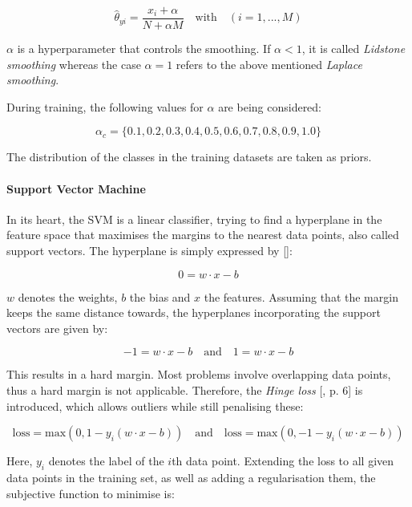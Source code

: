 \documentclass[11pt]{scrartcl}
\begin{document}
\begin{equation}
	\hat{\theta}_{yi} = \frac{x_{i} + \alpha}{N + \alpha M} \quad\text{with}\quad (i = 1,...,M)
\end{equation}

$\alpha$ is a hyperparameter that controls the smoothing. If $\alpha < 1$, it is called \textit{Lidstone smoothing} whereas the case $\alpha = 1$ refers to the above mentioned \textit{Laplace smoothing}.

During training, the following values for $\alpha$ are being considered:

\begin{equation}
	\alpha_c = \{0.1, 0.2, 0.3, 0.4, 0.5, 0.6, 0.7, 0.8, 0.9, 1.0\}
\end{equation}

The distribution of the classes in the training datasets are taken as priors.

\paragraph{Support Vector Machine} In its heart, the SVM is a linear classifier, trying to find a hyperplane in the feature space that maximises the margins to the nearest data points, also called support vectors. The hyperplane is simply expressed by [\cite{svm}]:

\begin{equation}
	0 = w \cdot x - b
\end{equation}

$w$ denotes the weights, $b$ the bias and $x$ the features. Assuming that the margin keeps the same distance towards, the hyperplanes incorporating the support vectors are given by:

\begin{equation}
	-1 = w \cdot x - b \quad\text{and}\quad 1 = w \cdot x - b
\end{equation}

This results in a hard margin. Most problems involve overlapping data points, thus a hard margin is not applicable. Therefore, the \textit{Hinge loss} [\cite{hingeloss}, p. 6] is introduced, which allows outliers while still penalising these:

\begin{equation}
	\text{loss} = \text{max}(0, 1 - y_i(w \cdot x-b)) \quad\text{and}\quad \text{loss} = \text{max}(0, -1 - y_i(w \cdot x-b))
\end{equation}

Here, $y_i$ denotes the label of the $i$th data point. Extending the loss to all given data points in the training set, as well as adding a regularisation them, the subjective function to minimise is:
\end{document}
